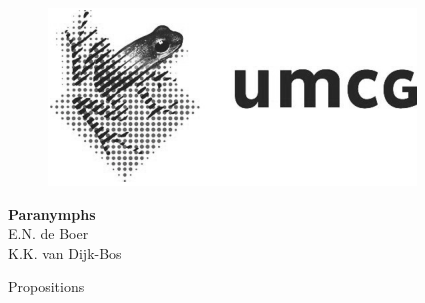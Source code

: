 \begin{figure}[!htbp]
	\centering
	
	\begin{minipage}[b]{0.24\textwidth}
		\includegraphics[width=\textwidth]{img/colofon_umcg_zw}
	\end{minipage}
	\hfill
	\begin{minipage}[b]{0.29\textwidth}
	\end{minipage}
	
\end{figure}

\clearpage



\clearpage

\noindent
\textbf{Paranymphs}\\
E.N. de Boer\\
K.K. van Dijk-Bos\\

\clearpage
\null\newpage

\noindent
	\Large
Propositions

\small

